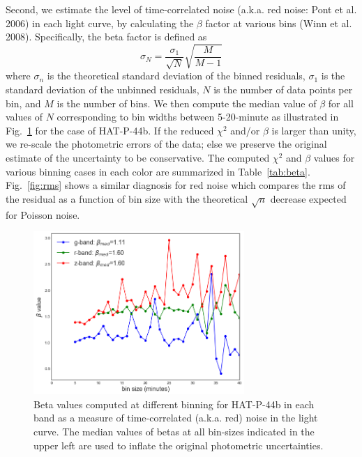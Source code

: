 Second, we estimate the level of time-correlated noise (a.k.a. red noise: Pont et al. 2006) in each light curve, by calculating the $\beta$ factor at various bins (Winn et al. 2008). 
Specifically, the beta factor is defined as
\begin{equation} \label{eq:beta}
\sigma_N = \frac{\sigma_1}{\sqrt{N}}\sqrt{\frac{M}{M-1}}
\end{equation}
where $\sigma_n$ is the theoretical standard deviation of the binned residuals, $\sigma_1$ is the standard deviation of the unbinned residuals, $N$ is the number of data points per bin, and $M$ is the number of bins. We then compute the median value of $\beta$ for all values of $N$ corresponding to bin widths between 5-20-minute as illustrated in Fig.~\ref{fig:beta} for the case of HAT-P-44b.
If the reduced $\chi^2$ and/or $\beta$ is larger than unity, we re-scale the photometric errors of the data; else we preserve the original estimate of the uncertainty to be conservative. The computed $\chi^2$ and $\beta$ values for various binning cases in each color are summarized in Table~\ref{tab:beta}.
Fig.~\ref{fig:rms} shows a similar diagnosis for red noise which compares the rms of the residual as a function of bin size with the theoretical $\sqrt{n}$ decrease expected for Poisson noise.


\begin{figure}
\centering
\includegraphics[width=8cm]{figures/beta.png}
\caption{Beta values computed at different binning for HAT-P-44b in each band as a measure of time-correlated (a.k.a. red) noise in the light curve. The median values of betas at all bin-sizes indicated in the upper left are used to inflate the original photometric uncertainties.}
\label{fig:beta}
\end{figure}

